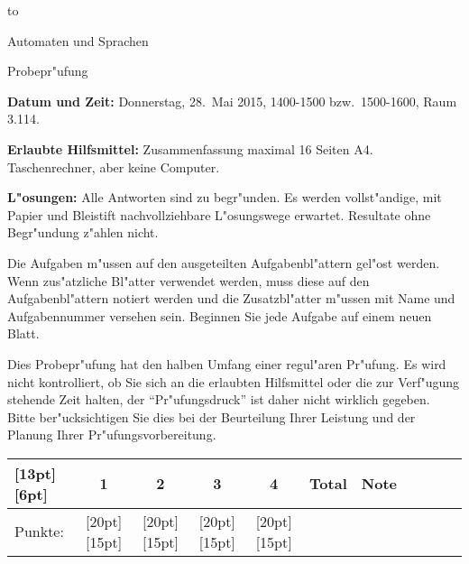 %
%
%


\phantom{a}
\vspace{0.8cm}
{\parindent0pt\hbox to}
\vspace{1.5cm}

\begin{center}
{\LARGE Automaten und Sprachen}

\vspace{0.5cm}
{\Large Probepr"ufung}

\vspace{1.5cm}
\end{center}

{\parindent 0pt
{\bf Datum und Zeit:}
Donnerstag, 28.~Mai 2015, 1400-1500 bzw.~1500-1600, Raum 3.114.
\smallskip

{\bf Erlaubte Hilfsmittel:} Zusammenfassung maximal 16 Seiten A4.
Taschenrechner, aber keine Computer.
\smallskip

{\bf L"osungen:} Alle Antworten sind zu begr"unden.
Es werden vollst"andige, mit Papier und Bleistift
nachvollziehbare L"o\-sungs\-wege erwartet. Resultate ohne Begr"undung
z"ahlen nicht.

Die Aufgaben m"ussen
auf den ausgeteilten Aufgabenbl"attern gel"ost werden. Wenn zus"atzliche
Bl"atter verwendet werden, muss diese auf den Aufgabenbl"attern notiert
werden und die Zusatzbl"atter m"ussen mit Name und Aufgabennummer versehen
sein. Beginnen Sie jede Aufgabe auf einem neuen Blatt.

Dies Probepr"ufung hat den halben Umfang einer regul"aren Pr"ufung.
Es wird nicht kontrolliert, ob Sie sich an die erlaubten Hilfsmittel
oder die zur Verf"ugung stehende Zeit halten, der ``Pr"ufungsdruck'' ist
daher nicht wirklich gegeben.
Bitte ber"ucksichtigen Sie dies bei der Beurteilung Ihrer Leistung
und der Planung Ihrer Pr"ufungsvorbereitung.
}

\vspace{1cm}

\begin{center}
\begin{tabular}{|l|c|c|c|c|c|c|c|c|c|c|}
\hline
\raisebox{0pt}[13pt][6pt]{\phantom{XX}}&1&2&3&4&Total&Note\\
\hline
Punkte:&
\raisebox{0pt}[20pt][15pt]{\phantom{XX}}&
\raisebox{0pt}[20pt][15pt]{\phantom{XX}}&
\raisebox{0pt}[20pt][15pt]{\phantom{XX}}&
\raisebox{0pt}[20pt][15pt]{\phantom{XX}}&\phantom{XXX}&\phantom{XXXX}\\
\hline
\end{tabular}
\end{center}


\pagebreak
\keineloesungen




